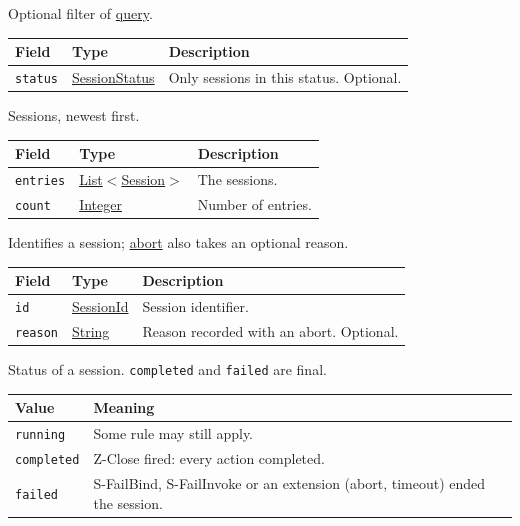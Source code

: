 \documentclass[a4paper]{arrowhead}
\newcommand{\mref}[1]{{\textcolor{ArrowheadPurple}{\hyperref[sec:model:#1]{#1}}}}
\newcommand{\oref}[1]{{\textcolor{ArrowheadBlue}{\hyperref[sec:operations:#1]{#1}}}}
\newcommand{\pref}[1]{{\textcolor{ArrowheadGrey}{\hyperref[sec:model:primitives:#1]{#1}}}}
\begin{document}
Optional filter of \oref{query}.

{\small
\begin{longtable}{|p{3.9cm}|p{4.4cm}|p{7.5cm}|}

\hline
\rowcolor{gray!33} Field & Type & Description \\ \hline
\endhead
\texttt{status} & \mref{SessionStatus} & Only sessions in this status. Optional. \\ \hline
\end{longtable}
}

Sessions, newest first.

{\small
\begin{longtable}{|p{3.9cm}|p{4.4cm}|p{7.5cm}|}

\hline
\rowcolor{gray!33} Field & Type & Description \\ \hline
\endhead
\texttt{entries} & \pref{List}$<$\mref{Session}$>$ & The sessions. \\ \hline
\texttt{count} & \pref{Integer} & Number of entries. \\ \hline
\end{longtable}
}

Identifies a session; \oref{abort} also takes an optional reason.

{\small
\begin{longtable}{|p{3.9cm}|p{4.4cm}|p{7.5cm}|}

\hline
\rowcolor{gray!33} Field & Type & Description \\ \hline
\endhead
\texttt{id} & \pref{SessionId} & Session identifier. \\ \hline
\texttt{reason} & \pref{String} & Reason recorded with an abort. Optional. \\ \hline
\end{longtable}
}

Status of a session. \texttt{completed} and \texttt{failed} are final.

{\small
\begin{longtable}{|p{3.9cm}|p{11.9cm}|}

\hline
\rowcolor{gray!33} Value & Meaning \\ \hline
\endhead
\texttt{running} & Some rule may still apply. \\ \hline
\texttt{completed} & Z-Close fired: every action completed. \\ \hline
\texttt{failed} & S-FailBind, S-FailInvoke or an extension (abort, timeout) ended the session. \\ \hline
\end{longtable}
}
\end{document}
